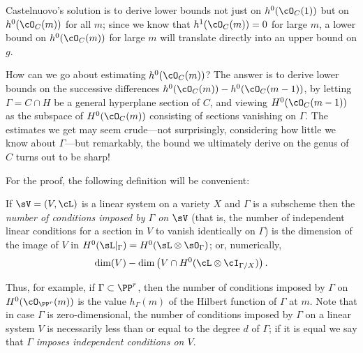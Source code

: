Castelnuovo's solution  is to derive lower bounds not just on $h^0(\cO_C(1))$ but on $h^0(\cO_C(m))$ for all $m$; since we know that $h^1(\cO_C(m)) = 0$ for large $m$, a lower bound on $h^0(\cO_C(m))$ for large $m$ will translate directly into an upper bound on $g$.

How can we go about estimating $h^0(\cO_C(m))$? The answer is to derive lower bounds on the successive differences $h^0(\cO_C(m)) - h^0(\cO_C(m-1))$, by letting $\Gamma = C \cap H$ be a general hyperplane section of $C$, and viewing $H^0(\cO_C(m-1))$ as the subspace of $H^0(\cO_C(m))$ consisting of sections vanishing on $\Gamma$. The estimates we get may seem crude---not surprisingly, considering how little we know about $\Gamma$---but remarkably, the bound we ultimately derive on the genus of $C$ turns out to be sharp!

For the proof, the following definition will be convenient:

\begin{definition}
If $\sV = (V,\cL)$ is a linear system on a variety $X$ and $\Gamma$ is a subscheme then the \emph{number of conditions imposed by $\Gamma$ on $\sV$} (that is, the number of independent linear conditions for a section in $V$ to vanish
identically on $\Gamma$) is the dimension of the image of $V$ in $H^0(\sL|_\Gamma) = H^0(\sL \otimes \sO_\Gamma)$; or, numerically,
$$
\dim(V) - \dim \left(V \cap H^0(\cL\otimes \cI_{\Gamma/X}) \right).
$$
\end{definition}

Thus, for example, if $\Gamma \subset \PP^r$, then the number of conditions imposed by $\Gamma$ on $H^0(\cO_{\PP^r}(m))$ is the value $h_\Gamma(m)$ of the Hilbert function of $\Gamma$ at $m$.
Note that in case $\Gamma$ is zero-dimensional, the number of conditions imposed by $\Gamma$ on a linear system $V$ is necessarily less than or equal to the degree $d$ of $\Gamma$; if it is equal we say that $\Gamma$ \emph{imposes independent conditions on $V$}.

